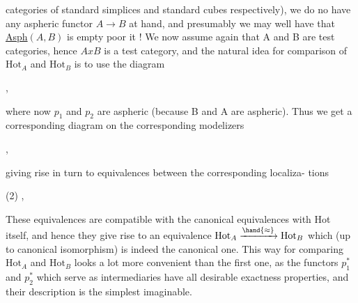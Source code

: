 
categories of standard simplices and standard cubes respectively), we
do no have any aspheric functor $A\to B$ at hand, and presumably we may
well have that \uline{Asph}$(A,B)$ is empty\hand{,} poor it ! We now assume again that
A and B are test categories, hence $AxB$ is a test category, and the
natural idea for comparison of $\mathrm{Hot}_A$ and $\mathrm{Hot}_B$ is to use the diagram

\quad ,

where now $p_1$ and $p_2$ are aspheric (because B and A are aspheric). Thus
we get a corresponding diagram on the corresponding modelizers

\quad ,

giving rise in turn to equivalences between the corresponding localiza-%
tions

(2)\qquad
{}\quad ,

These equivalences are compatible with the canonical  equivalences
with Hot itself, and hence they give rise to an equivalence $\mathrm{Hot}_A\xrightarrow{\hand{\approx}}\mathrm{Hot}_B$
which (up to canonical isomorphism) is indeed the canonical one. This
way for comparing $\mathrm{Hot}_A$ and $\mathrm{Hot}_B$ looks a lot more convenient than the
first one, as the functors $p_1^{*}$ and $p_2^{*}$ which serve as intermediaries
have all desirable exactness properties, and their  description is the
simplest imaginable.

